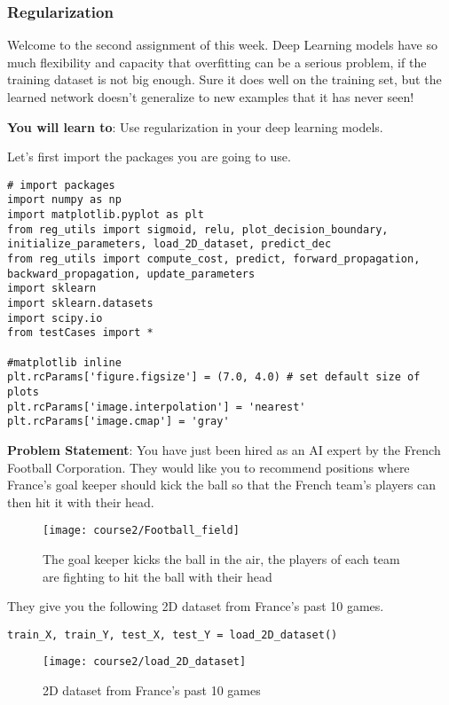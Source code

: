 \subsubsection{Regularization}

Welcome to the second assignment of this week. Deep Learning models have so much flexibility and capacity that overfitting can be a serious problem, if the training dataset is not big enough. Sure it does well on the training set, but the learned network doesn't generalize to new examples that it has never seen!

{\textbf{You will learn to}}: Use regularization in your deep learning models.


Let's first import the packages you are going to use.
\begin{verbatim}
# import packages
import numpy as np
import matplotlib.pyplot as plt
from reg_utils import sigmoid, relu, plot_decision_boundary, initialize_parameters, load_2D_dataset, predict_dec
from reg_utils import compute_cost, predict, forward_propagation, backward_propagation, update_parameters
import sklearn
import sklearn.datasets
import scipy.io
from testCases import *

#matplotlib inline
plt.rcParams['figure.figsize'] = (7.0, 4.0) # set default size of plots
plt.rcParams['image.interpolation'] = 'nearest'
plt.rcParams['image.cmap'] = 'gray'
\end{verbatim}

{\textbf {Problem Statement}}: You have just been hired as an AI expert by the French Football Corporation. They would like you to recommend positions where France's goal keeper should kick the ball so that the French team's players can then hit it with their head.

\begin{figure}[h]
\begin{center}
\texttt{[image: course2/Football\_field]}
\caption{The goal keeper kicks the ball in the air, the players of each team are fighting to hit the ball with their head}
\end{center}
\end{figure}

They give you the following 2D dataset from France's past 10 games.
\begin{verbatim}
train_X, train_Y, test_X, test_Y = load_2D_dataset()
\end{verbatim}
\vspace{-0.4cm}
\begin{figure}[h]
\begin{center}
\texttt{[image: course2/load\_2D\_dataset]}
\caption{ 2D dataset from France's past 10 games}
\end{center}
\end{figure}

